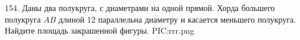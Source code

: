 154. Даны два полукруга, с диаметрами на одной прямой.
Хорда большего полукруга $AB$ длиной 12 параллельна диаметру и касается
меньшего полукруга. Найдите площадь закрашенной фигуры.
{{PIC:rrr.png}}\\
